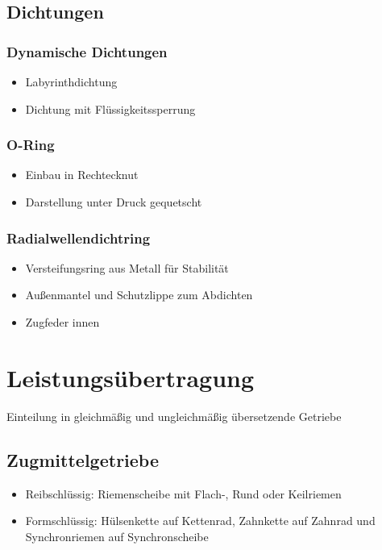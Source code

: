 \documentclass[a4paper,parskip=half*,DIV=7,fontsize=11pt]{scrartcl}
\begin{document}
\subsection{Dichtungen}
\subsubsection{Dynamische Dichtungen}
\begin{itemize}
	\item Labyrinthdichtung
	\item Dichtung mit Flüssigkeitssperrung 
\end{itemize}
	
\subsubsection{O-Ring}
\begin{itemize}
	\item Einbau in Rechtecknut
	\item Darstellung unter Druck gequetscht
\end{itemize}
	
\subsubsection{Radialwellendichtring}
\begin{itemize}
	\item Versteifungsring aus Metall für Stabilität
	\item Außenmantel und Schutzlippe zum Abdichten
	\item Zugfeder innen
\end{itemize}
	
\section{Leistungsübertragung}
Einteilung in gleichmäßig und ungleichmäßig übersetzende Getriebe
\subsection{Zugmittelgetriebe}
\begin{itemize}
	\item Reibschlüssig: Riemenscheibe mit Flach-, Rund oder Keilriemen
	\item Formschlüssig: Hülsenkette auf Kettenrad, Zahnkette auf Zahnrad und Synchronriemen auf Synchronscheibe
\end{itemize}
	
\end{document}
